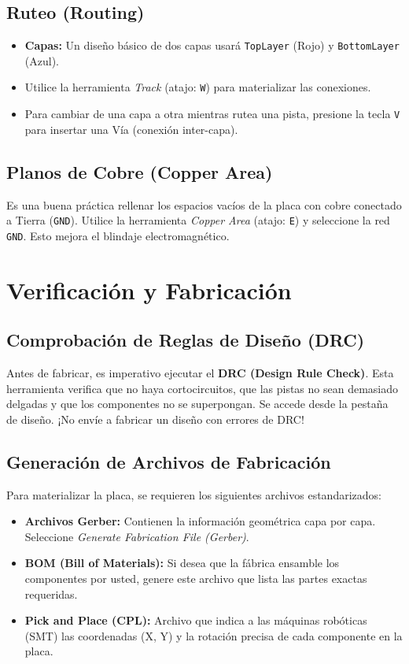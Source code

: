 \documentclass[12pt,a4paper]{article}
\begin{document}
\subsection{Ruteo (Routing)}
\begin{itemize}
    \item \textbf{Capas:} Un diseño básico de dos capas usará \texttt{TopLayer} (Rojo) y \texttt{BottomLayer} (Azul).
    \item Utilice la herramienta \textit{Track} (atajo: \texttt{W}) para materializar las conexiones.
    \item Para cambiar de una capa a otra mientras rutea una pista, presione la tecla \texttt{V} para insertar una Vía (conexión inter-capa).
\end{itemize}

\subsection{Planos de Cobre (Copper Area)}
Es una buena práctica rellenar los espacios vacíos de la placa con cobre conectado a Tierra (\texttt{GND}). Utilice la herramienta \textit{Copper Area} (atajo: \texttt{E}) y seleccione la red \texttt{GND}. Esto mejora el blindaje electromagnético.

\section{Verificación y Fabricación}

\subsection{Comprobación de Reglas de Diseño (DRC)}
Antes de fabricar, es imperativo ejecutar el \textbf{DRC (Design Rule Check)}. Esta herramienta verifica que no haya cortocircuitos, que las pistas no sean demasiado delgadas y que los componentes no se superpongan. Se accede desde la pestaña de diseño. ¡No envíe a fabricar un diseño con errores de DRC!

\subsection{Generación de Archivos de Fabricación}
Para materializar la placa, se requieren los siguientes archivos estandarizados:
\begin{itemize}
    \item \textbf{Archivos Gerber:} Contienen la información geométrica capa por capa. Seleccione \textit{Generate Fabrication File (Gerber)}.
    \item \textbf{BOM (Bill of Materials):} Si desea que la fábrica ensamble los componentes por usted, genere este archivo que lista las partes exactas requeridas.
    \item \textbf{Pick and Place (CPL):} Archivo que indica a las máquinas robóticas (SMT) las coordenadas (X, Y) y la rotación precisa de cada componente en la placa.
\end{itemize}
\end{document}
